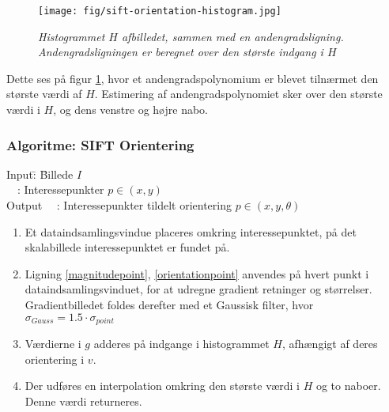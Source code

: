 \begin{figure}[H]
    \centering
    \texttt{[image: fig/sift-orientation-histogram.jpg]}
     \vspace{-1em}
    \begin{center}    
       \caption{{\footnotesize \textit{Histogrammet $H$ afbilledet, sammen med en andengradsligning. Andengradsligningen er beregnet over den største indgang i $H$}}}
    \label{histogramheight}
     \end{center}
     \vspace{-2.5em}
  \end{figure} \noindent
Dette ses på figur \ref{histogramheight}, hvor et andengradspolynomium er blevet tilnærmet den største værdi af $H$. Estimering af andengradspolynomiet sker over den største værdi i $H$, og dens venstre og højre nabo.


\subsubsection*{Algoritme: SIFT Orientering}
\begin{tabbing}
Input\quad \= : \= Billede $I$\\
$\text{ }$ \> : \> Interessepunkter $p  \in (x, y)$ \\
Output $\text{ }$ \> : \> Interessepunkter tildelt orientering $p \in (x,y, \theta)$
\end{tabbing}
\begin{enumerate}
\item Et dataindsamlingsvindue placeres omkring interessepunktet, på det skalabillede interessepunktet er fundet på.
\item Ligning \eqref{magnitudepoint}, \eqref{orientationpoint} anvendes på hvert punkt i dataindsamlingsvinduet, for at udregne gradient retninger og størrelser. Gradientbilledet foldes derefter med et Gaussisk filter, hvor $\sigma_{Gauss} = 1.5 \cdot \sigma_{point}$
\item Værdierne i $g$ adderes på indgange i histogrammet $H$, afhængigt af deres orientering i $v$.
\item  Der udføres en interpolation omkring den største værdi i $H$ og to naboer. Denne værdi returneres.
\end{enumerate}
